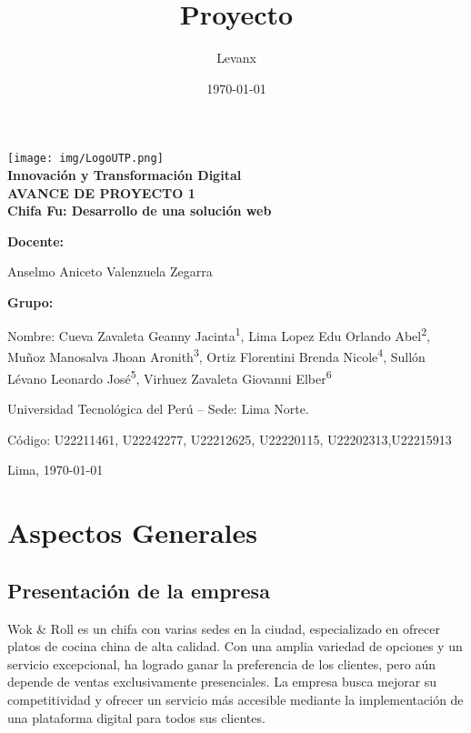 \documentclass{article}
\title{Proyecto}
\author{Levanx}
\date{\today}
\begin{document}
\begin{doublespace}
\begin{center}
    \vspace*{1cm}

    \centering
    \texttt{[image: img/LogoUTP.png]}\\[1cm]
    
    \large{\textbf{Innovación y Transformación Digital}} 
    \\[0.5cm] 
    
    \large{\bf AVANCE DE PROYECTO 1}
    \\[0.5cm] 
    \LARGE \textbf{{Chifa Fu: Desarrollo de una solución web}}
\end{center}
\vspace{2cm}
\large{\bf Docente: }
\begin{center}
    \large{Anselmo Aniceto Valenzuela Zegarra}
\end{center}
\large{\bf Grupo: }
\begin{center}
    \large{Nombre: Cueva Zavaleta Geanny Jacinta\textsuperscript{1}, Lima Lopez Edu Orlando Abel\textsuperscript{2}, Muñoz Manosalva Jhoan Aronith\textsuperscript{3}, Ortiz Florentini Brenda Nicole\textsuperscript{4}, Sullón Lévano Leonardo José\textsuperscript{5}, Virhuez Zavaleta Giovanni Elber\textsuperscript{6}}
\end{center}
\begin{center}
    \large{ Universidad Tecnológica del Perú – Sede: Lima Norte.}
\end{center}
    
\begin{center}
    \large{Código: U22211461, U22242277, U22212625, U22220115, U22202313,U22215913}
\end{center}
\begin{center}
Lima, \today
\end{center}
\newpage
\vspace*{0.1cm}
\tableofcontents
\newpage
\vspace*{0.2cm}
\section{Aspectos Generales}
    \subsection{Presentación de la empresa}
    \noindent Wok \& Roll es un chifa con varias sedes en la ciudad, especializado en ofrecer
platos de cocina china de alta calidad. Con una amplia variedad de opciones y un servicio excepcional, ha logrado ganar la preferencia de los clientes, pero aún depende de ventas exclusivamente presenciales. La empresa busca mejorar su competitividad y ofrecer un servicio más accesible mediante la implementación de una plataforma digital para todos sus clientes.


\end{doublespace}
\end{document}
